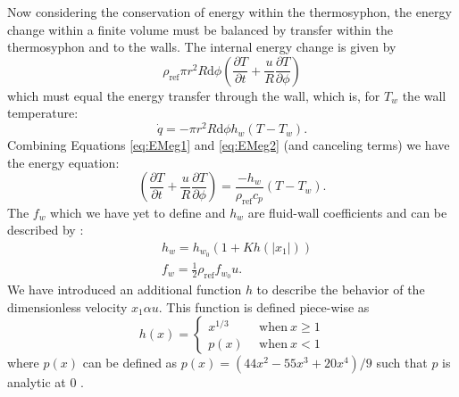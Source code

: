 \documentclass[12pt]{report}
\newcommand{\pdiff}[2]{\frac{\partial #1}{\partial #2}}
\newcommand{\rhoref}{\rho_{\text{ref}}}
\newcommand{\dphi}{\text{d}\phi}
\begin{document}
Now considering the conservation of energy within the thermosyphon, the energy change within a finite volume must be balanced by transfer within the thermosyphon and to the walls.
The internal energy change is given by
\begin{equation} \rhoref \pi r^2 R \dphi \left ( \pdiff{T}{t} + \frac{u}{R}\pdiff{T}{\phi} \right ) \label{eq:EMeg1}\end{equation}
which must equal the energy transfer through the wall, which is, for $T_w$ the wall temperature:
\begin{equation} \dot{q} = -\pi r^2 R \dphi h_w (T - T_w) . \label{eq:EMeg2} \end{equation}
Combining Equations \ref{eq:EMeg1} and \ref{eq:EMeg2} (and canceling terms) we have the energy equation:
\begin{equation} \left ( \pdiff{T}{t} + \frac{u}{R}\pdiff{T}{\phi} \right ) = \frac{-h_w}{\rhoref c_p} \left( T - T_w \right ) \label{eq:EMeq}.\end{equation}
The $f_w$ which we have yet to define and $h_w$ are fluid-wall coefficients and can be described by :
\begin{align*} & h_w = h_{w_0} \left ( 1 + K h(|x_1|) \right ) \\
& f_w = \frac{1}{2} \rhoref f_{w_0} u .\end{align*}
We have introduced an additional function $h$ to describe the behavior of the dimensionless velocity $x_1 \alpha u$.
This function is defined piece-wise as 
\begin{equation*} h (x) = \left \{ \begin{array}{ll} x^{1/3} & ~~\text{when} ~x \geq 1\\ p (x) & ~~\text{when} ~ x <1 \end{array} \right. \end{equation*} 
where $p(x)$ can be defined as $p(x) = \left( 44x^2 -55 x^3 + 20x^4 \right ) /9$ such that $p$ is analytic at 0 .
\end{document}
